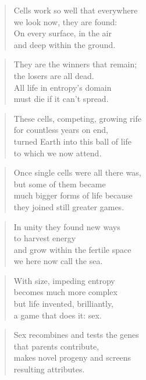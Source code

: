 \documentclass[14pt,a4paper]{article}
\begin{document}
\begin{verse}
Cells work so well that everywhere\\
we look now, they are found:\\
On every surface, in the air\\
and deep within the ground.
\end{verse}

\begin{verse}
They are the winners that remain;\\
the losers are all dead.\\
All life in entropy’s domain\\
must die if it can’t spread.
\end{verse}

\begin{verse}
These cells, competing, growing rife\\
for countless years on end,\\
turned Earth into this ball of life\\
to which we now attend.
\end{verse}

\begin{verse}
Once single cells were all there was,\\
but some of them became\\
much bigger forms of life because\\
they joined still greater games.
\end{verse}

\begin{verse}
In unity they found new ways\\
to harvest energy\\
and grow within the fertile space\\
we here now call the sea.
\end{verse}

\begin{verse}
With size, impeding entropy\\
becomes much more complex\\
but life invented, brilliantly,\\
a game that does it: sex.
\end{verse}

\begin{verse}
Sex recombines and tests the genes\\
that parents contribute,\\
makes novel progeny and screens\\
resulting attributes.
\end{verse}
\end{document}
